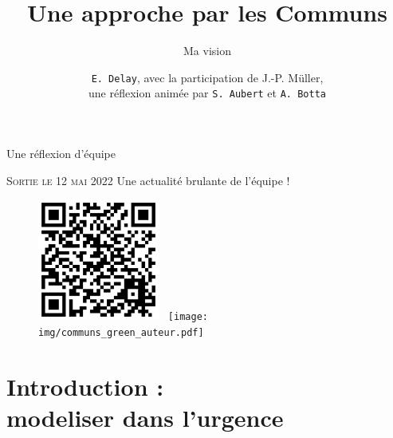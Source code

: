 \documentclass[newPxFont]{beamer}
\title{Une approche par les Communs}
\subtitle{Ma vision}
\author{\texttt{E. Delay}, avec la participation de J.-P. Müller,\\
 une réflexion animée par \texttt{S. Aubert} et \texttt{A. Botta}}
\institute{CIRAD -- UMR SENS}
\begin{document}
%
%


\maketitle


%
%


\begin{frame}[c]{Une réflexion d'équipe}
\vspace{-1cm}
\begin{alertblock}{\textsc{ Sortie le 12 mai 2022}}
    Une actualité brulante de l'équipe !
\end{alertblock}
\begin{figure}
  \includegraphics[height=4cm]{img/qrcode_quae.png}~
  \texttt{[image: img/communs\_green\_auteur.pdf]}
\end{figure}
\end{frame}

\section{Introduction :\\ modeliser dans l'urgence}
\end{document}
